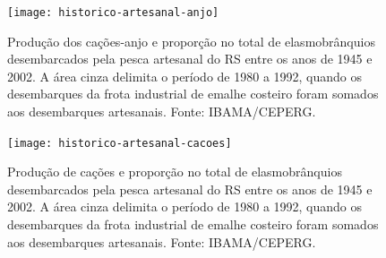 \documentclass[a4paper,11pt,twoside,showtrims,onecolumn,openright,final]{memoir}
\begin{document}


\begin{figure}
\begin{center}
\texttt{[image: historico-artesanal-anjo]}
\end{center}
\caption[Produção dos cações-anjo e proporção no total de elasmobrânquios 
         desembarcados pela pesca artesanal do RS entre os anos de 1945 e 2002]
        {Produção dos cações-anjo e proporção no total de elasmobrânquios 
         desembarcados pela pesca artesanal do RS entre os anos de 1945 e 2002.
	 A área cinza delimita o período de 1980 a 1992, quando os 
	 desembarques da frota industrial de emalhe costeiro foram 
	 somados aos desembarques artesanais.
	 Fonte: IBAMA/CEPERG.}
\label{fig:historico-artesanal-anjo}	 
\end{figure}



\begin{figure}
\begin{center}
\texttt{[image: historico-artesanal-cacoes]}
\end{center}
\caption[Produção de cações e proporção no total de elasmobrânquios 
         desembarcados pela pesca artesanal do RS entre os anos de 1945 e 2002]
        {Produção de cações e proporção no total de elasmobrânquios 
         desembarcados pela pesca artesanal do RS entre os anos de 1945 e 2002.
	 A área cinza delimita o período de 1980 a 1992, quando os 
	 desembarques da frota industrial de emalhe costeiro foram 
	 somados aos desembarques artesanais.
	 Fonte: IBAMA/CEPERG.}
\label{fig:historico-artesanal-cacoes}	 
\end{figure}


\end{document}
